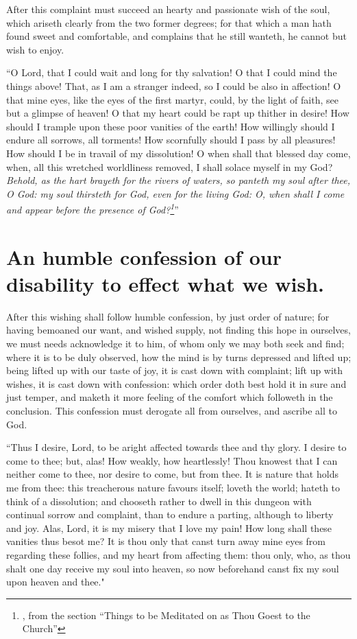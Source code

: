 After this complaint must succeed an hearty and passionate wish of the soul, which ariseth clearly from the two former degrees; for that which a man hath found sweet and comfortable, and complains that he still wanteth, he cannot but wish to enjoy. 

``O Lord, that I could wait and long for thy salvation! O that I could mind the things above! That, as I am a stranger indeed, so I could be also in affection! O that mine eyes, like the eyes of the first martyr, could, by the light of faith, see but a glimpse of heaven! O that my heart could be rapt up thither in desire! How should I trample upon these poor vanities of the earth! How willingly should I endure all sorrows, all torments! How scornfully should I pass by all pleasures! How should I be in travail of my dissolution! O when shall that blessed day come, when, all this wretched worldliness removed, I shall solace myself in my God? \emph{Behold, as the hart brayeth for the rivers of waters, so panteth my soul after thee, O God: my soul thirsteth for God, even for the living God: O, when shall I come and appear before the presence of God?\footnote{\cite{bayley1611}, from the section ``Things to be Meditated on as Thou Goest to the Church''  }}'' 

\section{An humble confession of our disability to effect what we wish.}

After this wishing shall follow humble confession, by just order of nature; for having bemoaned our want, and wished supply, not finding this hope in ourselves, we must needs acknowledge it to him, of whom only we may both seek and find; where it is to be duly observed, how the mind is by turns depressed and lifted up; being lifted up with our taste of joy, it is cast down with complaint; lift up with wishes, it is cast down with confession: which order doth best hold it in sure and just temper, and maketh it more feeling of the comfort which followeth in the conclusion. This confession must derogate all from ourselves, and ascribe all to God. 

``Thus I desire, Lord, to be aright affected towards thee and thy glory. I desire to come to thee; but, alas! How weakly, how heartlessly! Thou knowest that I can neither come to thee, nor desire to come, but from thee. It is nature that holds me from thee: this treacherous nature favours itself; loveth the world; hateth to think of a dissolution; and chooseth rather to dwell in this dungeon with continual sorrow and complaint, than to endure a parting, although to liberty and joy. Alas, Lord, it is my misery that I love my pain! How long shall these vanities thus besot me? It is thou only that canst turn away mine eyes from regarding these follies, and my heart from affecting them: thou only, who, as thou shalt one day receive my soul into heaven, so now beforehand canst fix my soul upon heaven and thee." 

